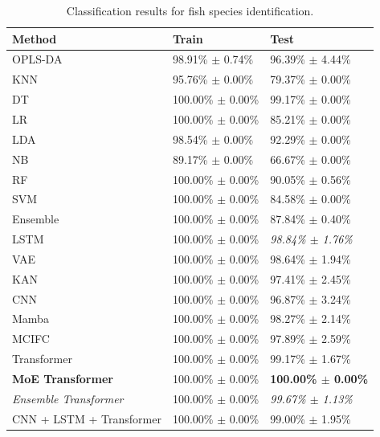 \begin{table}[t]
\centering
\caption{Classification results for fish species identification.}
\label{tab:species_results}
\begin{tabular}{l|l|l} \\
\hline
Method & Train & Test \\
\hline
OPLS-DA & 98.91\% $\pm$ 0.74\% & 96.39\% $\pm$ 4.44\% \\
KNN & 95.76\% $\pm$ 0.00\% & 79.37\% $\pm$ 0.00\% \\
DT & 100.00\% $\pm$ 0.00\% & 99.17\% $\pm$ 0.00\% \\
LR & 100.00\% $\pm$ 0.00\% & 85.21\% $\pm$ 0.00\% \\
LDA & 98.54\% $\pm$ 0.00\% & 92.29\% $\pm$ 0.00\% \\
NB & 89.17\% $\pm$ 0.00\% & 66.67\% $\pm$ 0.00\% \\
RF & 100.00\% $\pm$ 0.00\% & 90.05\% $\pm$ 0.56\% \\
SVM & 100.00\% $\pm$ 0.00\% & 84.58\% $\pm$ 0.00\% \\
Ensemble & 100.00\% $\pm$ 0.00\% & 87.84\% $\pm$ 0.40\% \\

LSTM & 100.00\% $\pm$ 0.00\% & \textit{98.84\% $\pm$ 1.76\%} \\
VAE & 100.00\% $\pm$ 0.00\% & 98.64\% $\pm$ 1.94\% \\
KAN & 100.00\% $\pm$ 0.00\% & 97.41\% $\pm$ 2.45\% \\
CNN & 100.00\% $\pm$ 0.00\% & 96.87\% $\pm$ 3.24\% \\
Mamba & 100.00\% $\pm$ 0.00\% & 98.27\% $\pm$ 2.14\% \\
MCIFC & 100.00\% $\pm$ 0.00\% & 97.89\% $\pm$ 2.59\% \\
Transformer & 100.00\% $\pm$ 0.00\% & 99.17\% $\pm$ 1.67\% \\
\textbf{MoE Transformer} & 100.00\% $\pm$ 0.00\% & \textbf{100.00\% $\pm$ 0.00\%} \\ 
\textit{Ensemble Transformer} & 100.00\% $\pm$ 0.00\% & \textit{99.67\% $\pm$ 1.13\%} \\ 
CNN + LSTM + Transformer & 100.00\% $\pm$ 0.00\% & 99.00\% $\pm$ 1.95\% \\ 
\hline
\end{tabular}
\end{table}


